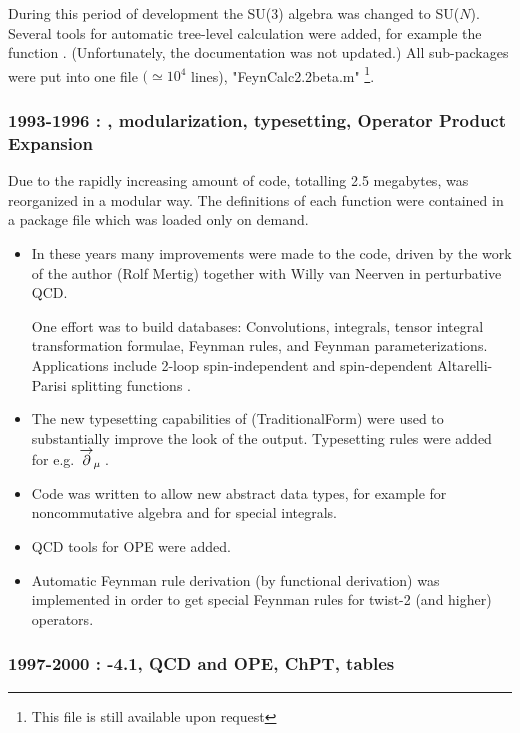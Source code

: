 During this period of development the SU(3) algebra was changed to SU($N$). Several tools for
automatic tree-level calculation were added, for example the function .
(Unfortunately, the  documentation was not updated.) All sub-packages were put into one file
\(\big(\simeq {{10}^4}\) lines), "FeynCalc2.2beta.m" \footnote{This file is still available upon
request}.

\subsubsection*{1993-1996 : , modularization, typesetting, Operator Product Expansion}

Due to the rapidly increasing amount of code, totalling 2.5 megabytes, \fc was
reorganized in a modular way. The definitions of each function were contained in
a package file which was loaded only on demand.

\begin{itemize}

\item
In these years many improvements were made to the code, driven by the work of the author
(Rolf Mertig) together with Willy van Neerven in perturbative QCD.

One effort was to build databases: Convolutions, integrals, tensor integral transformation
formulae, Feynman rules,
and Feynman parameterizations. 
Applications include 2-loop spin-independent and spin-dependent Altarelli-Parisi splitting
functions \cite{Altarelli:1977zs}.

\item The new typesetting capabilities of  (TraditionalForm) were used to substantially
improve the look of the output.
Typesetting rules were added for e.g. \({\overvar{\partial }{\rightarrow}}_{\mu } \multsp \).

\item Code was written to allow new abstract data types, for example for noncommutative algebra
and for special integrals.

\item QCD tools for OPE were added.

\item Automatic Feynman rule derivation (by functional
derivation) was implemented in order to get special Feynman rules
for twist-2 (and higher) operators.

\end{itemize}

\subsubsection*{1997-2000 : -4.1, QCD and OPE, ChPT, tables}

